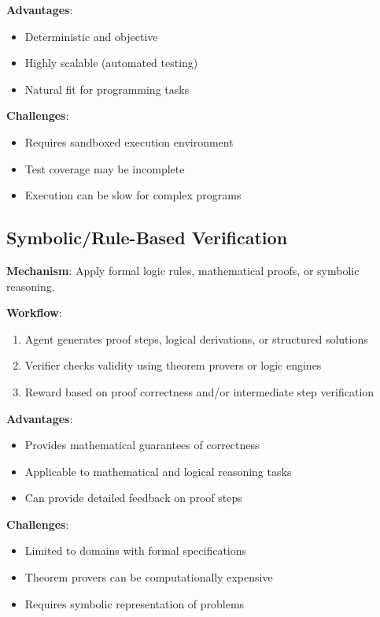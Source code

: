 \documentclass[11pt,a4paper]{article}
\begin{document}
\textbf{Advantages}:
\begin{itemize}[leftmargin=*]
    \item Deterministic and objective
    \item Highly scalable (automated testing)
    \item Natural fit for programming tasks
\end{itemize}

\textbf{Challenges}:
\begin{itemize}[leftmargin=*]
    \item Requires sandboxed execution environment
    \item Test coverage may be incomplete
    \item Execution can be slow for complex programs
\end{itemize}


\subsection{Symbolic/Rule-Based Verification}
\label{sec:symbolic}

\textbf{Mechanism}: Apply formal logic rules, mathematical proofs, or symbolic reasoning.

\textbf{Workflow}:
\begin{enumerate}[leftmargin=*]
    \item Agent generates proof steps, logical derivations, or structured solutions
    \item Verifier checks validity using theorem provers or logic engines
    \item Reward based on proof correctness and/or intermediate step verification
\end{enumerate}

\textbf{Advantages}:
\begin{itemize}[leftmargin=*]
    \item Provides mathematical guarantees of correctness
    \item Applicable to mathematical and logical reasoning tasks
    \item Can provide detailed feedback on proof steps
\end{itemize}

\textbf{Challenges}:
\begin{itemize}[leftmargin=*]
    \item Limited to domains with formal specifications
    \item Theorem provers can be computationally expensive
    \item Requires symbolic representation of problems
\end{itemize}
\end{document}
